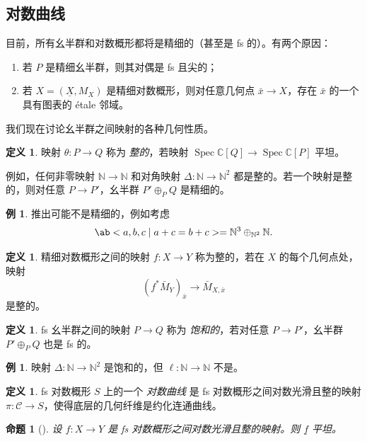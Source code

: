 \documentclass{amsart}
\newtheorem{prop}[thm]{命题}
\theoremstyle{definition}
\newtheorem{defn}[thm]{定义}
\newtheorem{exm}[thm]{例}
\theoremstyle{remark}
\theoremstyle{plain}
\theoremstyle{definition}
\theoremstyle{remark}
\newcommand{\N}{\mathbb{N}}
\newcommand{\C}{\mathbb{C}}
\newcommand{\mc}[1]{\mathcal{#1}}
\newcommand{\ul}[1]{\underline{#1}}
\newcommand{\1}{\mathbf{1}}
\newcommand{\2}{\mathbf{2}}
\newcommand{\3}{\mathbf{3}}
\DeclareMathOperator{\Spec}{Spec}
\begin{document}
\subsection{对数曲线}%
\label{sub:Log curves}

目前，所有幺半群和对数概形都将是精细的（甚至是 fs 的）。有两个原因：
\begin{enumerate}
    \item 若 \(P\) 是精细幺半群，则其对偶是 fs 且尖的；
    \item 若 \(X = (\ul{X}, M_X)\) 是精细对数概形，则对任意几何点 \(\bar{x} \to X\)，存在 \(\bar{x}\) 的一个具有图表的 \'etale 邻域。
\end{enumerate}

我们现在讨论幺半群之间映射的各种几何性质。
\begin{defn}
    映射 \(\theta \colon P \to Q\) 称为 \textit{整的}，若映射 \(\Spec\C[Q] \to \Spec \C[P]\) 平坦。
\end{defn}

例如，任何非零映射 \(\N \to \N\) 和对角映射 \(\Delta \colon\N \to \N^2\) 都是整的。若一个映射是整的，则对任意 \(P \to P'\)，幺半群 \(P' \oplus_P Q\) 是精细的。

\begin{exm}
    推出可能不是精细的，例如考虑
    \[ \ab< a ,b,c \mid a+c=b+c> = \N^3 \oplus_{\N^2} \N. \]
\end{exm}

\begin{defn}
    精细对数概形之间的映射 \(f \colon X \to Y\) 称为整的，若在 \(X\) 的每个几何点处，映射
    \[ (f^*\bar{M}_Y)_{\bar{x}} \to \bar{M}_{X,\bar{x}} \]
    是整的。
\end{defn}

\begin{defn}
    fs 幺半群之间的映射 \(P \to Q\) 称为 \textit{饱和的}，若对任意 \(P \to P'\)，幺半群 \(P' \oplus_P Q\) 也是 fs 的。
\end{defn}

\begin{exm}
    映射 \(\Delta \colon \N \to \N^2\) 是饱和的，但 \(\ell \colon \N \to \N\) 不是。
\end{exm}

\begin{defn}
    fs 对数概形 \(S\) 上的一个 \textit{对数曲线} 是 fs 对数概形之间对数光滑且整的映射 \(\pi \colon \mc{C} \to S\)，使得底层的几何纤维是约化连通曲线。
\end{defn}

\begin{prop}[{\cite{Kato1989}}]
    设 \(f \colon X \to Y\) 是 fs 对数概形之间对数光滑且整的映射。则 \(\ul{f}\) 平坦。
\end{prop}
\end{document}
